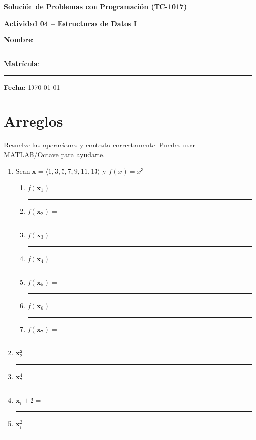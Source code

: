 \documentclass[spanish, 10pt]{article}
\newcommand{\shortresponserule}{{\large\rule{5 cm}{0.3mm}}}
\begin{document}
\begin{center}
	{\Large \textbf{Solución de Problemas con Programación (TC-1017)}}
	
	\bigskip
	{\large \textbf{Actividad 04 -- Estructuras de Datos I}}
\end{center}

\bigskip
{\large \textbf{Nombre}: \rule{13.7 cm}{0.4mm}}



\bigskip
{\large \textbf{Matrícula}: \rule{5 cm}{0.4mm}} \hfill {\large \textbf{Fecha}: \today}

\bigskip


\section{Arreglos}

Resuelve las operaciones y contesta correctamente. Puedes usar MATLAB/Octave para ayudarte.

\begin{enumerate}
    \itemsep2.5ex
    \item Sean $\mathbf{x} = \langle 1, 3, 5, 7, 9, 11, 13 \rangle$ y $f(x) = x^3$
        \bigskip
    \begin{enumerate}
        \item $f(\mathbf{x}_1) =$ \quad \; \shortresponserule
        \item $f(\mathbf{x}_2) =$ \quad \; \shortresponserule
        \item $f(\mathbf{x}_3) =$ \quad \; \shortresponserule
        \item $f(\mathbf{x}_4) =$ \quad \; \shortresponserule
        \item $f(\mathbf{x}_5) =$ \quad \; \shortresponserule
        \item $f(\mathbf{x}_6) =$ \quad \; \shortresponserule
        \item $f(\mathbf{x}_7) =$ \quad \; \shortresponserule
    \end{enumerate}
    \item $\mathbf{x}_2^2 =$ \hfill \shortresponserule
    \item $\mathbf{x}_7^4 =$ \hfill \shortresponserule
    \item $\mathbf{x}_i+2 =$  \hfill \shortresponserule
    \item $\mathbf{x}_i^2 =$  \hfill \shortresponserule
\end{enumerate}
\end{document}
